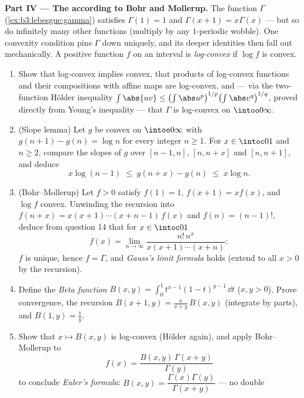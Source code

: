 \begin{problem}
\medskip
\noindent\textbf{Part IV --- The  according to
Bohr and Mollerup.} The function $\Gamma$
(\cref{ex:b3:lebesgue:gamma}) satisfies $\Gamma(1) = 1$ and
$\Gamma(x+1) = x\Gamma(x)$ --- but so do infinitely many other
functions (multiply by any $1$-periodic wobble). One convexity
condition pins $\Gamma$ down uniquely, and its deeper
identities then fall out mechanically. A positive function $f$
on an interval is \emph{log-convex} if $\log f$ is convex.
\begin{enumerate}[resume]
  \item Show that log-convex implies convex, that products of
        log-convex functions and their compositions with affine
        maps are log-convex, and --- via the two-function
        H\"older inequality $\int\abs{uv} \leq
        \bigl(\int\abs u^p\bigr)^{1/p}\bigl(\int\abs
        v^q\bigr)^{1/q}$, proved directly from Young's
        inequality --- that $\Gamma$ is log-convex on
        $\intoo0\infty$.
  \item (Slope lemma) Let $g$ be convex on $\intoo0\infty$
        with $g(n+1) - g(n) = \log n$ for every integer $n
        \geq 1$. For $x \in \intoc01$ and $n \geq 2$, compare
        the slopes of $g$ over $[n-1, n]$, $[n, n+x]$ and
        $[n, n+1]$, and deduce
        \[
        x\log(n-1) \;\leq\; g(n + x) - g(n) \;\leq\; x\log n .
        \]
  \item (Bohr--Mollerup) Let $f > 0$ satisfy $f(1) = 1$,
        $f(x+1) = xf(x)$, and $\log f$ convex. Unwinding the
        recursion into $f(n + x) = x(x+1)\cdots(x + n -
        1)\,f(x)$ and $f(n) = (n-1)!$, deduce from question 14
        that for $x \in \intoc01$
        \[
        f(x) = \lim_{n\to\infty}
        \frac{n!\,n^x}{x(x+1)\cdots(x+n)} :
        \]
        $f$ is unique, hence $f = \Gamma$, and \emph{Gauss's
        limit formula} holds (extend to all $x > 0$ by the
        recursion).
  \item Define the \emph{Beta function} $B(x, y) =
        \int_0^1t^{x-1}(1-t)^{y-1}\,\dd t$ ($x, y > 0$). Prove
        convergence, the recursion $B(x+1, y) =
        \frac{x}{x+y}\,B(x, y)$ (integrate by parts), and
        $B(1, y) = \frac1y$.
  \item Show that $x \mapsto B(x, y)$ is log-convex (H\"older
        again), and apply Bohr--Mollerup to
        \[
        f(x) = \frac{B(x, y)\,\Gamma(x + y)}{\Gamma(y)}
        \]
        to conclude \emph{Euler's formula}: $B(x, y) =
        \dfrac{\Gamma(x)\Gamma(y)}{\Gamma(x+y)}$ --- no double

\end{enumerate}
\end{problem}
